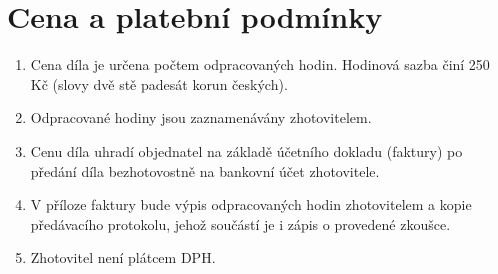 \documentclass[]{article}
\begin{document}
\section{Cena a platební podmínky}
\begin{enumerate}
	\item Cena díla je určena počtem odpracovaných hodin. Hodinová sazba činí 250 Kč (slovy dvě stě padesát korun českých).
	\item Odpracované hodiny jsou zaznamenávány zhotovitelem.
	\item Cenu díla uhradí objednatel na základě účetního dokladu (faktury) po předání díla bezhotovostně na bankovní účet zhotovitele.
	\item V příloze faktury bude výpis odpracovaných hodin zhotovitelem a kopie předávacího protokolu, jehož součástí je i zápis o provedené zkoušce.
	\item Zhotovitel není plátcem DPH.
\end{enumerate}
\end{document}
